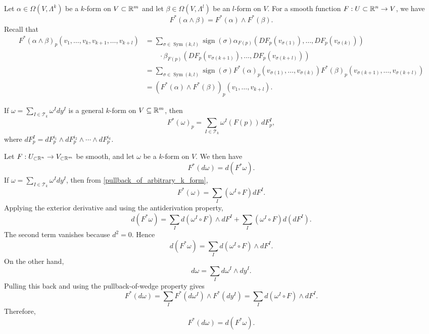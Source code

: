 {Let $\alpha\in\Omega(V,\Lambda^k)$ be a $k$-form on $V\subset\mathbb{R}^m$ and let $\beta\in\Omega(V,\Lambda^l)$ be an $l$-form on $V$. For a smooth function $F:U\subset\mathbb{R}^n\to V$, we have
\[
F^*(\alpha\wedge\beta)=F^*(\alpha)\wedge F^*(\beta).
\]}
{Recall that
\[
\begin{aligned}
F^*(\alpha\wedge\beta)_p(v_1,\ldots,v_k,v_{k+1},\ldots,v_{k+l})
&=\sum_{\sigma\in\operatorname{Sym}(k,l)}\operatorname{sign}(\sigma)\alpha_{F(p)}(DF_p(v_{\sigma(1)}),\ldots,DF_p(v_{\sigma(k)}))\\
&\qquad\cdot\beta_{F(p)}(DF_p(v_{\sigma(k+1)}),\ldots,DF_p(v_{\sigma(k+l)}))\\
&=\sum_{\sigma\in\operatorname{Sym}(k,l)}\operatorname{sign}(\sigma)F^*(\alpha)_p(v_{\sigma(1)},\ldots,v_{\sigma(k)})F^*(\beta)_p(v_{\sigma(k+1)},\ldots,v_{\sigma(k+l)})\\
&=(F^*(\alpha)\wedge F^*(\beta))_p(v_1,\ldots,v_{k+l}).
\end{aligned}
\]
}

If $\omega=\sum_{I\in\mathscr T_k}\omega^I dy^I$ is a general $k$-form on $V\subseteq\mathbb{R}^m$, then
\begin{equation}\label{pullback_of_arbitrary_k_form}
F^*(\omega)_p=\sum_{I\in\mathscr T_k}\omega^I(F(p))\,dF^I_p,
\end{equation}
where $dF^I_p=dF^{i_1}_p\wedge dF^{i_2}_p\wedge\cdots\wedge dF^{i_k}_p$.

{\label{pullback_commutes_with_derivative}
Let $F:U_{\subset\mathbb{R}^n}\to V_{\subset\mathbb{R}^m}$ be smooth, and let $\omega$ be a $k$-form on $V$. We then have
\[
F^*(d\omega)=d(F^*\omega).
\]}
{If $\omega=\sum_{I\in\mathscr T_k}\omega^I dy^I$, then from \ref{pullback_of_arbitrary_k_form},
\[
F^*(\omega)=\sum_I(\omega^I\circ F)dF^I.
\]
Applying the exterior derivative and using the antiderivation property,
\[
d(F^*\omega)=\sum_I d(\omega^I\circ F)\wedge dF^I+\sum_I(\omega^I\circ F)d(dF^I).
\]
The second term vanishes because $d^2=0$. Hence
\[
d(F^*\omega)=\sum_I d(\omega^I\circ F)\wedge dF^I.
\]
On the other hand,
\[
d\omega=\sum_I d\omega^I\wedge dy^I.
\]
Pulling this back and using the pullback-of-wedge property gives
\[
F^*(d\omega)=\sum_I F^*(d\omega^I)\wedge F^*(dy^I)=\sum_I d(\omega^I\circ F)\wedge dF^I.
\]
Therefore,
\[
F^*(d\omega)=d(F^*\omega).
\]
}


